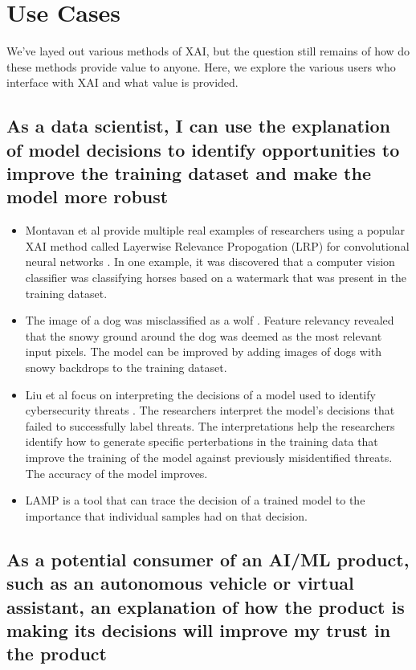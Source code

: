 \documentclass{IEEEtran}
\begin{document}
\section{Use Cases} \label{sec:UseCases}

We've layed out various methods of XAI, but the question still remains of how do these methods provide value to anyone.  Here, we explore the various users who interface with XAI and what value is provided.

\subsection{As a data scientist, I can use the explanation of model decisions to identify opportunities to improve the training dataset and make the model more robust}

\begin{itemize}
    \item Montavan et al provide multiple real examples of researchers using a popular XAI method called Layerwise Relevance Propogation (LRP) for convolutional neural networks \cite{MONTAVON20181}.  In one example, it was discovered that a computer vision classifier was classifying horses based on a watermark that was present in the training dataset.
    \item The image of a dog was misclassified as a wolf \cite{Ribeiro:2016:WIT:2939672.2939778}.  Feature relevancy revealed that the snowy ground around the dog was deemed as the most relevant input pixels.  The model can be improved by adding images of dogs with snowy backdrops to the training dataset.
    \item Liu et al focus on interpreting the decisions of a model used to identify cybersecurity threats \cite{Liu:2018:ADM:3219819.3220027}.  The researchers interpret the model's decisions that failed to successfully label threats.  The interpretations help the researchers identify how to generate specific perterbations in the training data that improve the training of the model against previously misidentified threats.  The accuracy of the model improves.
    \item LAMP is a tool that can trace the decision of a trained model to the importance that individual samples had on that decision. \cite{Ma2017}
\end{itemize}

\subsection{As a potential consumer of an AI/ML product, such as an autonomous vehicle or virtual assistant, an explanation of how the product is making its decisions will improve my trust in the product}
\end{document}
